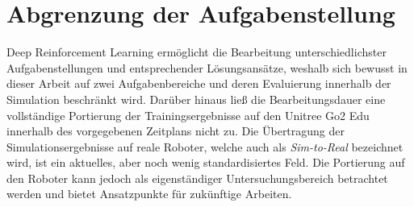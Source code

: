 \section{Abgrenzung der Aufgabenstellung}
Deep Reinforcement Learning ermöglicht die Bearbeitung unterschiedlichster Aufgabenstellungen und entsprechender Lösungsansätze, weshalb sich bewusst in dieser Arbeit auf zwei Aufgabenbereiche und deren Evaluierung innerhalb der Simulation beschränkt wird. Darüber hinaus ließ die Bearbeitungsdauer eine vollständige Portierung der Trainingsergebnisse auf den Unitree Go2 Edu innerhalb des vorgegebenen Zeitplans nicht zu. Die Übertragung der Simulationsergebnisse auf reale Roboter, welche auch als \textit{Sim-to-Real} bezeichnet wird, ist ein aktuelles, aber noch wenig standardisiertes Feld. Die Portierung auf den Roboter kann jedoch als eigenständiger Untersuchungsbereich betrachtet werden und bietet Ansatzpunkte für zukünftige Arbeiten.
